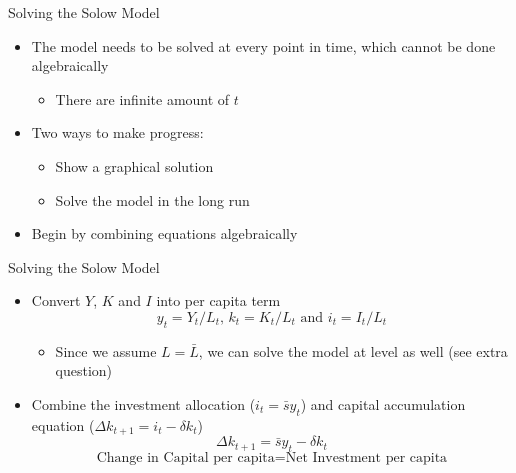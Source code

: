 \documentclass[aspectratio=1610]{beamer}
\begin{document}
\begin{frame}[wide]{Solving the Solow Model }
	\begin{itemize}
		\item The model needs to be solved at every point in time, which cannot be done algebraically
		\begin{itemize}
			\item There are infinite amount of $t$
		\end{itemize}
		\item Two ways to make progress:
		\begin{itemize}
			\item Show a graphical solution
			\item Solve the model in the long run
		\end{itemize}
		\item Begin by combining equations algebraically
	\end{itemize}
\end{frame}

\begin{frame}[wide]{Solving the Solow Model  }
	\begin{itemize}
		\item Convert $Y$, $K$ and $I$ into per capita term
		\[y_t = Y_t/L_t \text{, } k_t = K_t/L_t \text{ and } i_t = I_t/L_t\]
		\begin{itemize}
			\item Since we assume $L=\bar{L}$, we can solve the model at level as well (see extra question)
		\end{itemize}
		\item Combine the investment allocation ($i_t = \bar{s}y_t$) and capital accumulation equation ($\Delta k_{t+1} = i_t -\delta k_t$)
		\[\Delta k_{t+1} = \bar{s}y_t -\delta k_t\]
		\[\text{Change in Capital per capita} = \text{Net Investment per capita}\]
	\end{itemize}
\end{frame}
\end{document}
